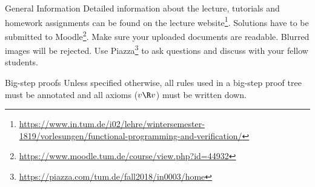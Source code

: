 \documentclass[
  english
]{tumteaching}
\begin{document}
\verticalline
\begin{disclaimer}{General Information}
	Detailed information about the lecture, tutorials and homework assignments can be found on the lecture website\footnote{\url{https://www.in.tum.de/i02/lehre/wintersemester-1819/vorlesungen/functional-programming-and-verification/}}. Solutions have to be submitted to Moodle\footnote{\url{https://www.moodle.tum.de/course/view.php?id=44932}}. Make sure your uploaded documents are readable. Blurred images will be rejected. Use Piazza\footnote{\url{https://piazza.com/tum.de/fall2018/in0003/home}} to ask questions and discuss with your fellow students.
\end{disclaimer}

\verticalline
\vspace*{-5mm}

\begin{disclaimer}{Big-step proofs}
  Unless specified otherwise, all rules used in a big-step proof tree must be annotated and all axioms ($v \R v$) must be written down.
\end{disclaimer}

\verticalline


\end{document}
